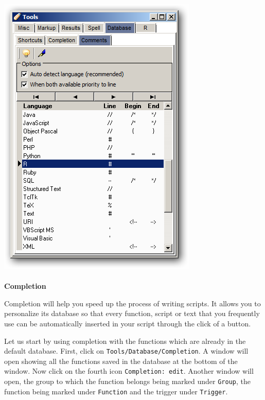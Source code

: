 \includegraphics[scale=0.50]{./res/tools_database_comments.png} \\

\paragraph{}\textbf{Completion}\\

Completion will help you speed up the process of writing \RR{} scripts.
It allows you to personalize its database so that every function, script or text that you
frequently use can be automatically inserted in your script through the click of a button.


Let us start by using completion with the functions which are already in the default database.
First, click on \texttt{Tools/Database/Completion}. A window will open showing all the functions saved in the
database at the bottom of the window. Now click on the fourth icon \texttt{Completion: edit}.
Another window will open, the group to which the function belongs being marked under \texttt{Group},
the function being marked under \texttt{Function} and the trigger under \texttt{Trigger}.

